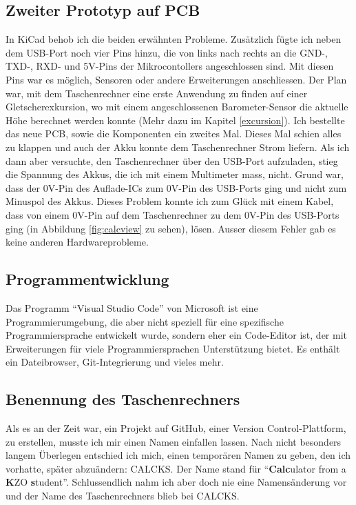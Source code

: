 \documentclass[12pt, a4paper]{report}
\begin{document}
\subsection{Zweiter Prototyp auf PCB} \label{secondproto}
In KiCad behob ich die beiden erwähnten Probleme. Zusätzlich fügte ich neben dem USB-Port noch vier Pins hinzu, die von links nach rechts an die GND-, TXD-, RXD- und 5V-Pins der Mikrocontollers angeschlossen sind. Mit diesen Pins war es möglich, Sensoren oder andere Erweiterungen anschliessen. Der Plan war, mit dem Taschenrechner eine erste Anwendung zu finden auf einer Gletscherexkursion, wo mit einem angeschlossenen Barometer-Sensor die aktuelle Höhe berechnet werden konnte (Mehr dazu im Kapitel \ref{excursion}). Ich bestellte das neue PCB, sowie die Komponenten ein zweites Mal. Dieses Mal schien alles zu klappen und auch der Akku konnte dem Taschenrechner Strom liefern. Als ich dann aber versuchte, den Taschenrechner über den USB-Port aufzuladen, stieg die Spannung des Akkus, die ich mit einem Multimeter mass, nicht. Grund war, dass der 0V-Pin des Auflade-ICs zum 0V-Pin des USB-Ports ging und nicht zum Minuspol des Akkus. Dieses Problem konnte ich zum Glück mit einem Kabel, dass von einem 0V-Pin auf dem Taschenrechner zu dem 0V-Pin des USB-Ports ging (in Abbildung \ref{fig:calcview} zu sehen), lösen. Ausser diesem Fehler gab es keine anderen Hardwareprobleme.
\subsection{Programmentwicklung}
Das Programm ``Visual Studio Code'' von Microsoft ist eine Programmierumgebung, die aber nicht speziell für eine spezifische Programmiersprache entwickelt wurde, sondern eher ein Code-Editor ist, der mit Erweiterungen für viele Programmiersprachen Unterstützung bietet. Es enthält ein Dateibrowser, Git-Integrierung und vieles mehr.
\subsection{Benennung des Taschenrechners}
Als es an der Zeit war, ein Projekt auf GitHub, einer Version Control-Plattform, zu erstellen, musste ich mir einen Namen einfallen lassen. Nach nicht besonders langem Überlegen entschied ich mich, einen temporären Namen zu geben, den ich vorhatte, später abzuändern: CALCKS. Der Name stand für ``\textbf{Calc}ulator from a \textbf{K}ZO \textbf{s}tudent''. Schlussendlich nahm ich aber doch nie eine Namensänderung vor und der Name des Taschenrechners blieb bei CALCKS.
\end{document}
